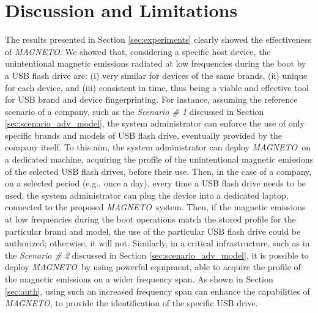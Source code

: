 \documentclass[acmsmall, authorversion]{acmart}
\newcommand{\sol}{\emph{MAGNETO}}
\begin{document}
\section{Discussion and Limitations}
\label{sec:discussion}

The results presented in Section \ref{sec:experiments} clearly showed the effectiveness of \sol. We showed that, considering a specific host device, the unintentional magnetic emissions radiated at low frequencies during the boot by a USB flash drive are: (i) very similar for devices of the same brands, (ii) unique for each device, and (iii) consistent in time, thus being a viable and effective tool for USB brand and device fingerprinting. 
For instance, assuming the reference scenario of a company, such as the \emph{Scenario \# 1} discussed in Section \ref{sec:scenario_adv_model}, the system administrator can enforce the use of only specific brands and models of USB flash drive, eventually provided by the company itself. To this aim, the system administrator can deploy \sol\ on a dedicated machine, acquiring the profile of the unintentional magnetic emissions of the selected USB flash drives, before their use.
Then, in the case of a company, on a selected period (e.g., once a day), every time a USB flash drive needs to be used, the system administrator can plug the device into a dedicated laptop, connected to the proposed \sol\ system. Then, if the magnetic emissions at low frequencies during the boot operations match the stored profile for the particular brand and model, the use of the particular USB flash drive could be authorized; otherwise, it will not. 
Similarly, in a critical infrastructure, such as in the \emph{Scenario \# 2} discussed in Section \ref{sec:scenario_adv_model}, it is possible to deploy \sol\ by using powerful equipment, able to acquire the profile of the magnetic emissions on a wider frequency span. As shown in Section \ref{sec:auth}, using such an increased frequency span can enhance the capabilities of \sol, to provide the identification of the specific USB drive.
\\
\end{document}
